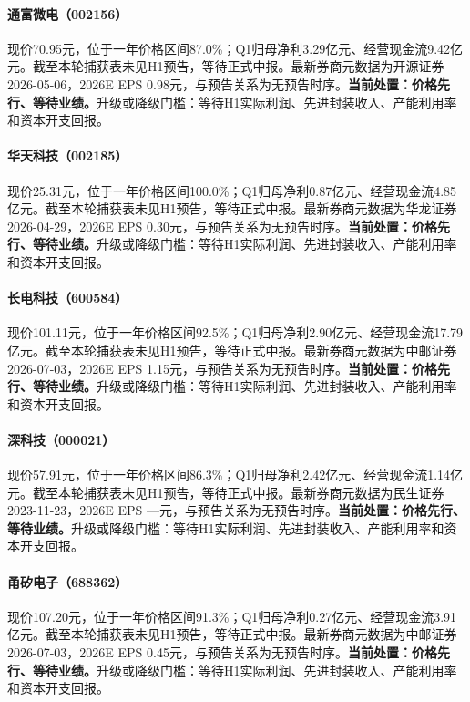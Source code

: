 \paragraph{通富微电（002156）}
现价70.95元，位于一年价格区间87.0\%；Q1归母净利3.29亿元、经营现金流9.42亿元。截至本轮捕获表未见H1预告，等待正式中报。最新券商元数据为开源证券 2026-05-06，2026E EPS 0.98元，与预告关系为无预告时序。\textbf{当前处置：价格先行、等待业绩。}升级或降级门槛：等待H1实际利润、先进封装收入、产能利用率和资本开支回报。

\paragraph{华天科技（002185）}
现价25.31元，位于一年价格区间100.0\%；Q1归母净利0.87亿元、经营现金流4.85亿元。截至本轮捕获表未见H1预告，等待正式中报。最新券商元数据为华龙证券 2026-04-29，2026E EPS 0.30元，与预告关系为无预告时序。\textbf{当前处置：价格先行、等待业绩。}升级或降级门槛：等待H1实际利润、先进封装收入、产能利用率和资本开支回报。

\paragraph{长电科技（600584）}
现价101.11元，位于一年价格区间92.5\%；Q1归母净利2.90亿元、经营现金流17.79亿元。截至本轮捕获表未见H1预告，等待正式中报。最新券商元数据为中邮证券 2026-07-03，2026E EPS 1.15元，与预告关系为无预告时序。\textbf{当前处置：价格先行、等待业绩。}升级或降级门槛：等待H1实际利润、先进封装收入、产能利用率和资本开支回报。

\paragraph{深科技（000021）}
现价57.91元，位于一年价格区间86.3\%；Q1归母净利2.42亿元、经营现金流1.14亿元。截至本轮捕获表未见H1预告，等待正式中报。最新券商元数据为民生证券 2023-11-23，2026E EPS ---元，与预告关系为无预告时序。\textbf{当前处置：价格先行、等待业绩。}升级或降级门槛：等待H1实际利润、先进封装收入、产能利用率和资本开支回报。

\paragraph{甬矽电子（688362）}
现价107.20元，位于一年价格区间91.3\%；Q1归母净利0.27亿元、经营现金流3.91亿元。截至本轮捕获表未见H1预告，等待正式中报。最新券商元数据为中邮证券 2026-07-03，2026E EPS 0.45元，与预告关系为无预告时序。\textbf{当前处置：价格先行、等待业绩。}升级或降级门槛：等待H1实际利润、先进封装收入、产能利用率和资本开支回报。

